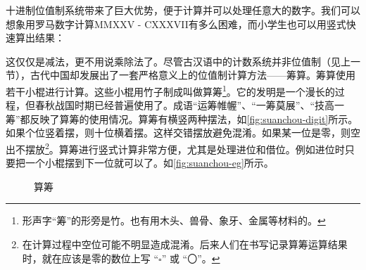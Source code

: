 \documentclass[b5paper]{article}
\begin{document}
十进制位值制系统带来了巨大优势，便于计算并可以处理任意大的数字。我们可以想象用罗马数字计算MMXXV - CXXXVII有多么困难，而小学生也可以用竖式快速算出结果：

\begin{center}
\end{center}

\label{sec:counting-rods} 
这仅仅是减法，更不用说乘除法了。尽管古汉语中的计数系统并非位值制（见上一节），古代中国却发展出了一套严格意义上的位值制计算方法——筹算。筹算使用若干小棍进行计算。这些小棍用竹子制成叫做算筹\footnote{形声字“筹”的形旁是竹。也有用木头、兽骨、象牙、金属等材料的。}。它的发明是一个漫长的过程，但春秋战国时期已经普遍使用了。成语“运筹帷幄”、“一筹莫展”、“技高一筹”都反映了算筹的使用情况。算筹有横竖两种摆法，如\cref{fig:suanchou-digit}所示。如果个位竖着摆，则十位横着摆。这样交错摆放避免混淆。如果某一位是零，则空出不摆放\footnote{在计算过程中空位可能不明显造成混淆。后来人们在书写记录算筹运算结果时，就在应该是零的数位上写 “$\square$” 或 “〇”。}。算筹进行竖式计算非常方便，尤其是处理进位和借位。例如进位时只要把一个小棍摆到下一位就可以了。如\cref{fig:suanchou-eg}所示。

\begin{figure}[htbp]
 \centering
 \caption{算筹}
\end{figure}
\end{document}
